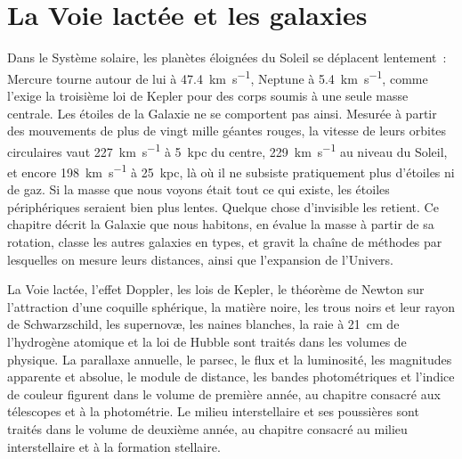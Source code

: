 \chapter{La Voie lactée et les galaxies}\label{ch:b3:milky-way-galaxies}

Dans le Système solaire, les planètes éloignées du Soleil se déplacent lentement~: Mercure
tourne autour de lui à \qty{47.4}{km.s^{-1}}, Neptune à \qty{5.4}{km.s^{-1}}, comme
l'exige la troisième loi de Kepler pour des corps soumis à une seule masse centrale. Les étoiles
de la Galaxie ne se comportent pas ainsi. Mesurée à partir des mouvements de plus de
vingt mille géantes rouges, la vitesse de leurs orbites circulaires vaut
\qty{227}{km.s^{-1}} à \qty{5}{kpc} du centre, \qty{229}{km.s^{-1}}
au niveau du Soleil, et encore \qty{198}{km.s^{-1}} à \qty{25}{kpc}, là où il ne subsiste
pratiquement plus d'étoiles ni de gaz. Si la masse que nous voyons était tout ce qui existe, les étoiles
périphériques seraient bien plus lentes. Quelque chose d'invisible les retient. Ce chapitre
décrit la Galaxie que nous habitons, en évalue la masse à partir de sa rotation, classe les
autres galaxies en types, et gravit la chaîne de méthodes par lesquelles on mesure leurs
distances, ainsi que l'expansion de l'Univers.

\begin{recall}
La Voie lactée, l'effet Doppler, les lois de Kepler, le théorème de Newton sur l'attraction
d'une coquille sphérique, la matière noire, les trous noirs et leur rayon de Schwarzschild, les
supernovæ, les naines blanches, la raie à \qty{21}{cm} de l'hydrogène atomique et la loi de
Hubble sont traités dans les volumes de physique. La parallaxe annuelle, le parsec, le flux et la
luminosité, les magnitudes apparente et absolue, le module de distance, les bandes
photométriques et l'indice de couleur figurent dans le volume de première année, au chapitre
consacré aux télescopes et à la photométrie. Le milieu interstellaire et ses poussières sont
traités dans le volume de deuxième année, au chapitre consacré au milieu interstellaire et à la
formation stellaire.
\end{recall}

